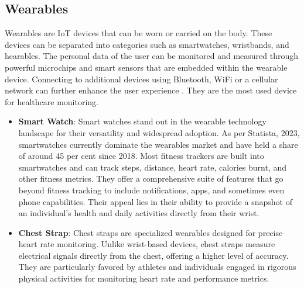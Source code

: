
\subsection{Wearables}

Wearables are IoT devices that can be worn or carried on the body. These devices can be separated into categories such as smartwatches, wristbands, and hearables. The personal data of the user can be monitored and measured through powerful microchips and smart sensors that are embedded within the wearable device. Connecting to additional devices using Bluetooth, WiFi or a cellular network can further enhance the user experience \cite{ref17}. They are the most used device for healthcare monitoring. \\

\begin{itemize}
    \item \textbf{Smart Watch}: Smart watches stand out in the wearable technology landscape for their versatility and widespread adoption. As per Statista, 2023, smartwatches currently dominate the wearables market and have held a share of around 45 per cent since 2018. Most fitness trackers are built into smartwatches and can track steps, distance, heart rate, calories burnt, and other fitness metrics. They offer a comprehensive suite of features that go beyond fitness tracking to include notifications, apps, and sometimes even phone capabilities. Their appeal lies in their ability to provide a snapshot of an individual's health and daily activities directly from their wrist.
    \item \textbf{Chest Strap}: Chest straps are specialized wearables designed for precise heart rate monitoring. Unlike wrist-based devices, chest straps measure electrical signals directly from the chest, offering a higher level of accuracy. They are particularly favored by athletes and individuals engaged in rigorous physical activities for monitoring heart rate and performance metrics.
\end{itemize}


